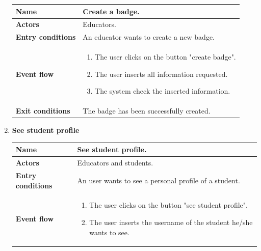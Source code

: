 \begin{enumerate}[label=\textbf{UC.\arabic*}]
\begin{table}[H]
                \renewcommand{\arraystretch}{1.5}
                \begin{tabular}{|m{3.2cm}|m{9.8cm}|}
                    \hline
                    \textbf{Name} & Create a badge. \\
                    \hline
                    \textbf{Actors} & Educators. \\
                    \hline
                    \textbf{Entry conditions}  & An educator wants to create a new badge. \\
                    \hline
                    \textbf{Event flow}  & 
                    \begin{enumerate}[label=\arabic*.]
                        \item The user clicks on the button "create badge".
                        \item The user inserts all information requested.
                        \item The system check the inserted information.
                    \end{enumerate}\\ 
                    \hline
                    \textbf{Exit conditions}  & The badge has been successfully created. \\
                    \hline
                \end{tabular}
        \end{table}
        \item {} \textbf{See student profile}
        \begin{table}[H]
    	    \centering
                \renewcommand{\arraystretch}{1.5}
                \begin{tabular}{|m{3.2cm}|m{9.8cm}|}
                    \hline
                    \textbf{Name} & See student profile. \\
                    \hline
                    \textbf{Actors} & Educators and students. \\
                    \hline
                    \textbf{Entry conditions}  & An user wants to see a personal profile of a student. \\
                    \hline
                    \textbf{Event flow}  & 
                    \begin{enumerate}[label=\arabic*.]
                        \item The user clicks on the button "see student profile".
                        \item The user inserts the username of the student he/she wants to see.

\end{enumerate}
\end{tabular}
\end{table}
\end{enumerate}
